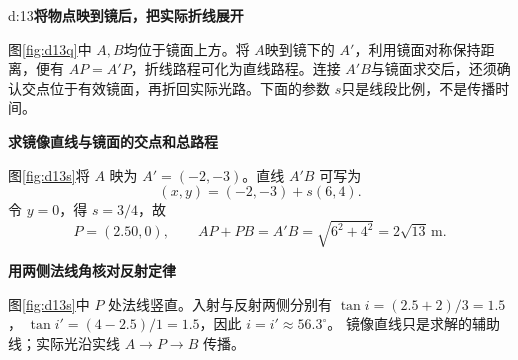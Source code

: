 \begin{drillsolution}{d:13}\textbf{将物点映到镜后，把实际折线展开}\par\nobreak
图\ref{fig:d13q}中 $A,B$均位于镜面上方。将 $A$映到镜下的 $A'$，利用镜面对称保持距离，便有 $AP=A'P$，折线路程可化为直线路程。连接 $A'B$与镜面求交后，还须确认交点位于有效镜面，再折回实际光路。下面的参数 $s$只是线段比例，不是传播时间。



\par\medskip{}\noindent\textbf{求镜像直线与镜面的交点和总路程}\par\nobreak
图\ref{fig:d13s}将 \(A\) 映为 \(A'=(-2,-3)\)。直线 \(A'B\) 可写为
\[
 (x,y)=(-2,-3)+s(6,4).
\]
令 \(y=0\)，得 \(s=3/4\)，故
\[
 \boxed{P=(2.50,0)},\qquad
 \boxed{AP+PB=A'B=\sqrt{6^2+4^2}=2\sqrt{13}\,\mathrm m}.
\]



\par\medskip{}\noindent\textbf{用两侧法线角核对反射定律}\par\nobreak
图\ref{fig:d13s}中 \(P\) 处法线竖直。入射与反射两侧分别有
\(\tan i=(2.5+2)/3=1.5\)，
\(\tan i'=(4-2.5)/1=1.5\)，因此 \(i=i'\approx56.3^\circ\)。
镜像直线只是求解的辅助线；实际光沿实线 \(A\to P\to B\) 传播。
\end{drillsolution}
